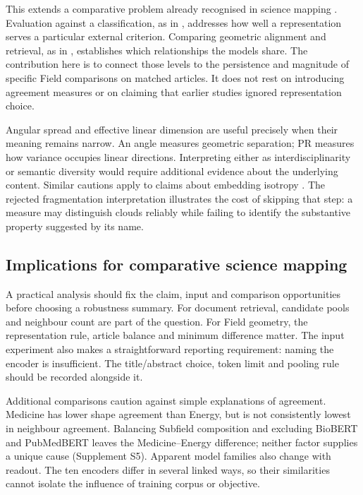 \documentclass[12pt]{article}
\begin{document}
This extends a comparative problem already recognised in science mapping \citep{refa0d2d707e6,ref6a2f5912bc}. Evaluation against a classification, as in \citet{refc0e2cc29e0}, addresses how well a representation serves a particular external criterion. Comparing geometric alignment and retrieval, as in \citet{ref4e1e0d5582}, establishes which relationships the models share. The contribution here is to connect those levels to the persistence and magnitude of specific Field comparisons on matched articles. It does not rest on introducing agreement measures or on claiming that earlier studies ignored representation choice.

Angular spread and effective linear dimension are useful precisely when their meaning remains narrow. An angle measures geometric separation; PR measures how variance occupies linear directions. Interpreting either as interdisciplinarity or semantic diversity would require additional evidence about the underlying content. Similar cautions apply to claims about embedding isotropy \citep{rudman-etal-2022-isoscore}. The rejected fragmentation interpretation illustrates the cost of skipping that step: a measure may distinguish clouds reliably while failing to identify the substantive property suggested by its name.

\subsection{Implications for comparative science mapping}
A practical analysis should fix the claim, input and comparison opportunities before choosing a robustness summary. For document retrieval, candidate pools and neighbour count are part of the question. For Field geometry, the representation rule, article balance and minimum difference matter. The input experiment also makes a straightforward reporting requirement: naming the encoder is insufficient. The title/abstract choice, token limit and pooling rule should be recorded alongside it.

Additional comparisons caution against simple explanations of agreement. Medicine has lower shape agreement than Energy, but is not consistently lowest in neighbour agreement. Balancing Subfield composition and excluding BioBERT and PubMedBERT leaves the Medicine--Energy difference; neither factor supplies a unique cause (Supplement S5). Apparent model families also change with readout. The ten encoders differ in several linked ways, so their similarities cannot isolate the influence of training corpus or objective.
\end{document}
